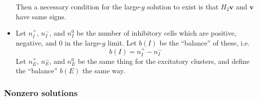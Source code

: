 \documentclass[11pt,reqno]{amsart}
\begin{document}
\begin{itemize}
Then a necessary condition for the large-$g$ solution to exist is that $H_2 \mathbf{v}$ and $\mathbf{v}$ have same signs.

\item Let $n_I^+$, $n_I^-$, and $n_I^0$ be the number of inhibitory cells which are positive, negative, and 0 in the large-$g$ limit. Let $b(I)$ be the ``balance'' of these, i.e.
\[
b(I) = n_I^+ - n_I^-
\]
Let $n_E^+$, $n_E^-$, and $n_E^0$ be the same thing for the excitatory clusters, and define the ``balance'' $b(E)$ the same way.
 
\end{itemize}

\subsubsection{Nonzero solutions}
\end{document}
